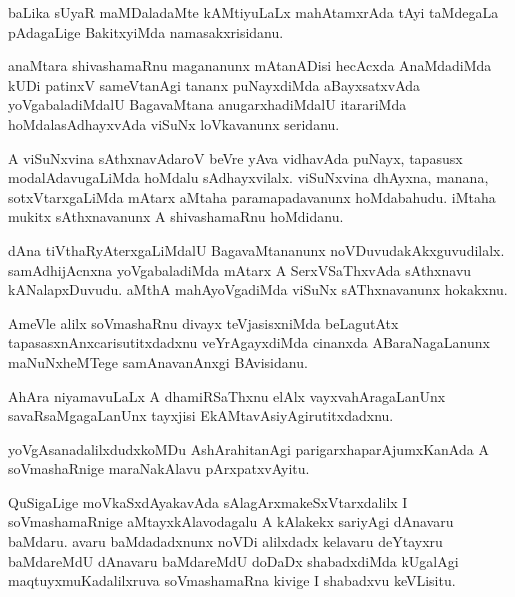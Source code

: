 \documentclass{article}
\begin{document}
\begin{mn}
baLika sUyaR maMDaladaMte kAMtiyuLaLx mahAtamxrAda tAyi taMdegaLa 
pAdagaLige BakitxyiMda namasakxrisidanu.
\end{mn}

\begin{mn}
anaMtara shivashamaRnu magananunx mAtanADisi hecAcxda AnaMdadiMda kUDi
patinxV sameVtanAgi tananx puNayxdiMda aBayxsatxvAda yoVgabaladiMdalU 
BagavaMtana anugarxhadiMdalU itarariMda hoMdalasAdhayxvAda viSuNx 
loVkavanunx seridanu. 
\end{mn}

\begin{mn}
A viSuNxvina sAthxnavAdaroV beVre yAva vidhavAda puNayx, tapasusx 
modalAdavugaLiMda hoMdalu sAdhayxvilalx. viSuNxvina dhAyxna, manana, 
sotxVtarxgaLiMda mAtarx aMtaha paramapadavanunx hoMdabahudu. iMtaha mukitx 
sAthxnavanunx A shivashamaRnu hoMdidanu.
\end{mn}

\begin{mn}
dAna tiVthaRyAterxgaLiMdalU BagavaMtananunx noVDuvudakAkxguvudilalx. 
samAdhijAcnxna yoVgabaladiMda mAtarx A SerxVSaThxvAda sAthxnavu 
kANalapxDuvudu. aMthA mahAyoVgadiMda viSuNx sAThxnavanunx hokakxnu.
\end{mn}

\begin{mn}
AmeVle alilx soVmashaRnu divayx teVjasisxniMda beLagutAtx 
tapasasxnAnxcarisutitxdadxnu veYrAgayxdiMda cinanxda ABaraNagaLanunx 
maNuNxheMTege samAnavanAnxgi BAvisidanu.
\end{mn}

\begin{mn}
AhAra niyamavuLaLx A dhamiRSaThxnu elAlx vayxvahAragaLanUnx savaRsaMgagaLanUnx
tayxjisi EkAMtavAsiyAgirutitxdadxnu.
\end{mn}

\begin{mn}
yoVgAsanadalilxdudxkoMDu AshArahitanAgi parigarxhaparAjumxKanAda 
A soVmashaRnige maraNakAlavu pArxpatxvAyitu.
\end{mn}

\begin{mn}
QuSigaLige moVkaSxdAyakavAda sAlagArxmakeSxVtarxdalilx I soVmashamaRnige
aMtayxkAlavodagalu A kAlakekx sariyAgi  dAnavaru baMdaru. avaru baMdadadxnunx
noVDi alilxdadx kelavaru deYtayxru baMdareMdU dAnavaru baMdareMdU doDaDx
shabadxdiMda kUgalAgi maqtuyxmuKadalilxruva soVmashamaRna kivige 
I shabadxvu keVLisitu.
\end{mn}
\end{document}
